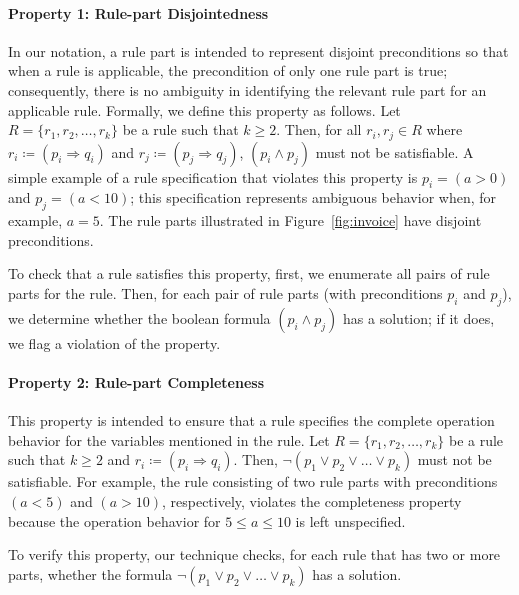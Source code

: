 \paragraph*{Property 1: Rule-part Disjointedness}
In our notation, a rule part is intended to represent disjoint preconditions so
that when a rule is applicable, the precondition of only one rule part is true;
consequently, there is no ambiguity in identifying the relevant rule part for an
applicable rule. Formally, we define this property as follows. Let $R= \{r_1,
r_2, \ldots, r_k\}$ be a rule such that $k \geq 2$. Then, for all $r_i, r_j \in
R$ where $ r_i \coloneqq (p_i \Longrightarrow q_i)$ and $r_j \coloneqq (p_j
\Longrightarrow q_j)$, $(p_i \wedge p_j)$ must not be satisfiable. A simple
example of a rule specification that violates this property is $p_i = (a > 0)$
and $p_j = (a < 10)$; this specification represents ambiguous behavior when, for
example, $a = 5$.  The rule parts illustrated in Figure~\ref{fig:invoice} have
disjoint preconditions.

To check that a rule satisfies this property, first, we enumerate all pairs of
rule parts for the rule. Then, for each pair of rule parts (with preconditions
$p_i$ and $p_j$), we determine whether the boolean formula $(p_i \wedge p_j)$
has a solution; if it does, we flag a violation of the property.

\paragraph*{Property 2: Rule-part Completeness}
This property is intended to ensure that a rule specifies the complete operation
behavior for the variables mentioned in the rule. Let $R= \{r_1, r_2, \ldots,
r_k\}$ be a rule such that $k \geq 2$ and $r_i \coloneqq (p_i \Longrightarrow
q_i)$. Then, $\neg(p_1 \vee p_2 \vee \ldots \vee p_k)$ must not be
satisfiable. For example, the rule consisting of two rule parts with
preconditions $(a < 5)$ and $(a > 10)$, respectively, violates the completeness
property because the operation behavior for $5 \leq a \leq 10$ is left
unspecified.

To verify this property, our technique checks, for each rule that has two or
more parts, whether the formula $\neg(p_1 \vee p_2 \vee \ldots \vee p_k)$ has a
solution.


